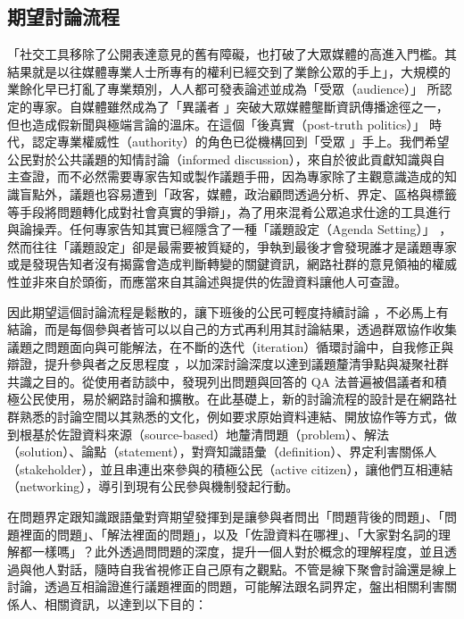 \documentclass[12pt,a4paper]{article}
\begin{document}
\subsection{期望討論流程}
\label{sec:orgad9f33f}
「社交工具移除了公開表達意見的舊有障礙，也打破了大眾媒體的高進入門檻。其結果就是以往媒體專業人士所專有的權利已經交到了業餘公眾的手上」\citep*[p.59]{xue11_xiang}，大規模的業餘化早已打亂了專業類別，人人都可發表論述並成為「受眾（audience）」\citep*{wimmer03_da} 所認定的專家。自媒體雖然成為了「異議者 」突破大眾媒體壟斷資訊傳播途徑之一，但也造成假新聞與極端言論的溫床。在這個「後真實（post-truth politics）」\citep*{wiki:posttruth} 時代，認定專業權威性（authority）的角色已從機構回到「受眾 」手上。我們希望公民對於公共議題的知情討論（informed discussion），來自於彼此貢獻知識與自主查證，而不必然需要專家告知或製作議題手冊，因為專家除了主觀意識造成的知識盲點外，議題也容易遭到「政客，媒體，政治顧問透過分析、界定、區格與標籤等手段將問題轉化成對社會真實的爭辯」\citep*[p.123]{yanyuan09_gong}，為了用來混肴公眾追求仕途的工具進行與論操弄。任何專家告知其實已經隱含了一種「議題設定（Agenda Setting）」\citep*{wimmer03_da} ，然而往往「議題設定」卻是最需要被質疑的，爭執到最後才會發現誰才是議題專家或是發現告知者沒有揭露會造成判斷轉變的關鍵資訊，網路社群的意見領袖的權威性並非來自於頭銜，而應當來自其論述與提供的佐證資料讓他人可查證。

因此期望這個討論流程是鬆散的，讓下班後的公民可輕度持續討論 \citep*{xueji11_xia} ，不必馬上有結論，而是每個參與者皆可以以自己的方式再利用其討論結果，透過群眾協作收集議題之問題面向與可能解法，在不斷的迭代（iteration）循環討論中，自我修正與辯證，提升參與者之反思程度 \cite{fleck10} ，以加深討論深度以達到議題釐清爭點與凝聚社群共識之目的。從使用者訪談中，發現列出問題與回答的 QA 法普遍被倡議者和積極公民使用，易於網路討論和擴散。在此基礎上，新的討論流程的設計是在網路社群熟悉的討論空間以其熟悉的文化，例如要求原始資料連結、開放協作等方式，做到根基於佐證資料來源（source-based）地釐清問題（problem）、解法（solution）、論點（statement），對齊知識語彙（definition）、界定利害關係人（stakeholder），並且串連出來參與的積極公民（active citizen），讓他們互相連結（networking），導引到現有公民參與機制發起行動。

在問題界定跟知識跟語彙對齊期望發揮到是讓參與者問出「問題背後的問題」、「問題裡面的問題」、「解法裡面的問題」，以及「佐證資料在哪裡」、「大家對名詞的理解都一樣嗎」？此外透過問問題的深度，提升一個人對於概念的理解程度，並且透過與他人對話，隨時自我省視修正自己原有之觀點。不管是線下聚會討論還是線上討論，透過互相論證進行議題裡面的問題，可能解法跟名詞界定，盤出相關利害關係人、相關資訊，以達到以下目的：
\end{document}

